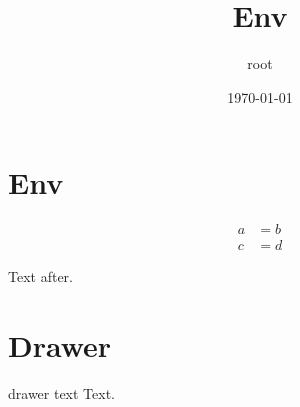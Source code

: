 \documentclass[11pt]{article}
\author{root}
\date{\today}
\title{Env}
\begin{document}
\maketitle
\tableofcontents

\section{Env}
\label{sec:org8e112cc}
\begin{align}
a &= b \\
c &= d
\end{align}

Text after.

\section{Drawer}
\label{sec:orgd11f098}
drawer text
Text.
\end{document}
